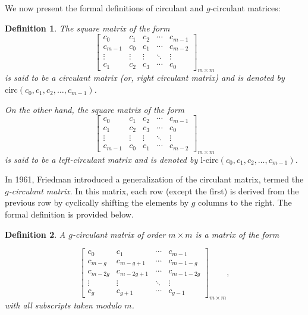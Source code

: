 \documentclass[12pt]{article}
\newtheorem{definition}{Definition}
\begin{document}
We now present the formal definitions of circulant and \( g \)-circulant matrices:



\begin{definition}
	The square matrix of the form
	\[
	\begin{bmatrix}
		c_0 & c_1 & c_2 & \cdots & c_{m-1} \\
		c_{m-1} & c_0 & c_1 & \cdots & c_{m-2} \\
		\vdots & \vdots & \vdots & \ddots & \vdots \\
		c_1 & c_2 & c_3 & \cdots & c_0
	\end{bmatrix}_{m \times m}
	\]
	is said to be a \textit{circulant matrix} (or, right circulant matrix) and is denoted by $\text{circ}(c_0, c_1, c_2, \ldots, c_{m-1})$.

On the other hand, the square matrix of the form
\[
\begin{bmatrix}
	c_0 & c_1 & c_2 & \cdots & c_{m-1} \\
	c_1 & c_2 & c_3 & \cdots & c_0 \\
	\vdots & \vdots & \vdots & \ddots & \vdots \\
	c_{m-1} & c_0 & c_1 & \cdots & c_{m-2}
\end{bmatrix}_{m\times m}
\]
is said to be a \textit{left-circulant matrix} and is denoted by $\text{l-circ}(c_0, c_1, c_2, \ldots, c_{m-1})$.
\end{definition}
In 1961, Friedman \cite{friedman1961eigenvalues} introduced a generalization of the circulant matrix, termed the \textit{$g$-circulant matrix}. In this matrix, each row (except the first) is derived from the previous row by cyclically shifting the elements by $g$ columns to the right. The formal definition is provided below.

\begin{definition}
	A \textit{$g$-circulant matrix} of order $m \times m$ is a matrix of the form

	\[
	\begin{bmatrix}
		c_0 & c_1 & \cdots & c_{m-1} \\
		c_{m-g} & c_{m-g+1} & \cdots & c_{m-1-g} \\
		c_{m-2g} & c_{m-2g+1} & \cdots & c_{m-1-2g} \\
		\vdots & \vdots & \ddots & \vdots \\
		c_g & c_{g+1} & \cdots & c_{g-1}
	\end{bmatrix}_{m\times m},
	\]
	with all subscripts taken modulo $m$.
\end{definition}
\end{document}
